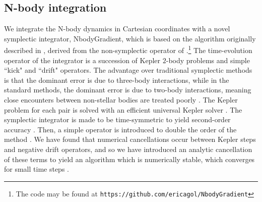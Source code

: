 \documentclass[twocolumn]{aastex63}
\begin{document}

\subsection{N-body integration}

We integrate the N-body dynamics in Cartesian coordinates with a novel symplectic
integrator, \textsf{NbodyGradient}, which is based on the algorithm originally described in \cite{Hernandez2015}, derived from the non-symplectic operator of \cite{GoncalvesFerrari2014}.\footnote{The code may be found at
    \texttt{https://github.com/ericagol/NbodyGradient}}  The time-evolution operator of the integrator is a succession of Kepler $2$-body problems and simple ``kick" and ``drift" operators.  %
The advantage over traditional symplectic methods \citep{Wisdom1991} is that the dominant error is due to three-body interactions, while in the standard methods, the dominant error is due to two-body interactions, meaning close encounters between non-stellar bodies are treated poorly \citep{Hernandez2017}.    The Kepler problem
for each pair is solved with an efficient universal Kepler solver \citep{Wisdom2015}.
The symplectic integrator is made to be time-symmetric to yield second-order
accuracy \citep{Hernandez2015}.  Then, a simple operator is introduced to double the order of the method \citep{Dehnen2017}.
We have found that numerical cancellations occur between Kepler steps
and negative drift operators, and so we have introduced an analytic cancellation
of these terms to yield an algorithm which is numerically stable,
which converges for small time steps \citep{Agol2020}.
\end{document}
